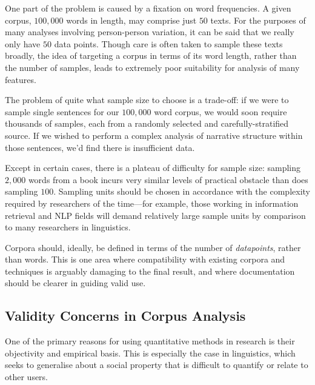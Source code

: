 
One part of the problem is caused by a fixation on word frequencies. A given corpus, $100,000$ words in length, may comprise just $50$ texts. For the purposes of many analyses involving person-person variation, it can be said that we really only have $50$ data points. Though care is often taken to sample these texts broadly, the idea of targeting a corpus in terms of its word length, rather than the number of samples, leads to extremely poor suitability for analysis of many features.

The problem of quite what sample size to choose is a trade-off: if we were to sample single sentences for our $100,000$ word corpus, we would soon require thousands of samples, each from a randomly selected and carefully-stratified source. If we wished to perform a complex analysis of narrative structure within those sentences, we'd find there is insufficient data.

Except in certain cases, there is a plateau of difficulty for sample size: sampling $2,000$ words from a book incurs very similar levels of practical obstacle than does sampling $100$. Sampling units should be chosen in accordance with the complexity required by researchers of the time---for example, those working in information retrieval and NLP fields will demand relatively large sample units by comparison to many researchers in linguistics.

Corpora should, ideally, be defined in terms of the number of \textsl{datapoints}, rather than words.  This is one area where compatibility with existing corpora and techniques is arguably damaging to the final result, and where documentation should be clearer in guiding valid use.















\subsection{Validity Concerns in Corpus Analysis}
One of the primary reasons for using quantitative methods in research is their objectivity and empirical basis.  This is especially the case in linguistics, which seeks to generalise about a social property that is difficult to quantify or relate to other users.

